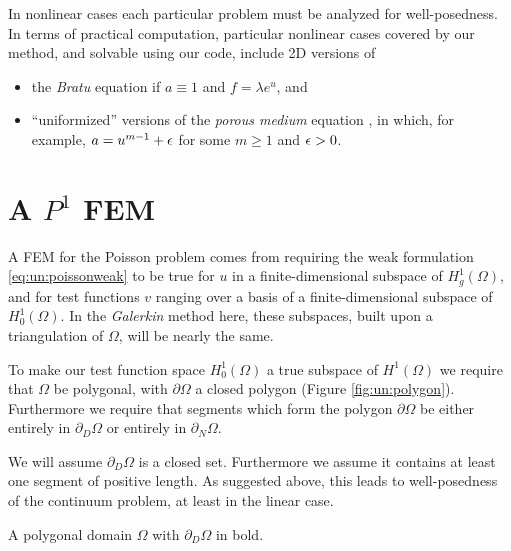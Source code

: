 In nonlinear cases each particular problem must be analyzed for well-posedness.  In terms of practical computation, particular nonlinear cases covered by our method, and solvable using our code, include 2D versions of
\begin{itemize}
\item the \emph{Bratu} equation if $a\equiv 1$ and $f=\lambda e^u$, and
\item ``uniformized'' versions of the \emph{porous medium} equation \citep{Ockendonetal2003}, in which, for example, $a=u^{m-1}+\epsilon$ for some $m\ge 1$ and $\epsilon>0$.
\end{itemize}


\section{A $P^1$ FEM}

A FEM for the Poisson problem comes from requiring the weak formulation \eqref{eq:un:poissonweak} to be true for $u$ in a finite-dimensional subspace of $H_{g}^1(\Omega)$, and for test functions $v$ ranging over a basis of a finite-dimensional subspace of $H_{0}^1(\Omega)$.  In the \emph{Galerkin} method here, these subspaces, built upon a triangulation of $\Omega$, will be nearly the same.

To make our test function space $H_{0}^1(\Omega)$ a true subspace of $H^1(\Omega)$ we require that $\Omega$ be polygonal, with $\partial\Omega$ a closed polygon (Figure \ref{fig:un:polygon}).  Furthermore we require that segments which form the polygon $\partial\Omega$ be either entirely in $\partial_D\Omega$ or entirely in $\partial_N\Omega$.

We will assume $\partial_D\Omega$ is a closed set.  Furthermore we assume it contains at least one segment of positive length.  As suggested above, this leads to well-posedness of the continuum problem, at least in the linear case.

\begin{marginfigure}

\caption{A polygonal domain $\Omega$ with $\partial_D\Omega$ in bold.}
\label{fig:un:polygon}
\end{marginfigure}

